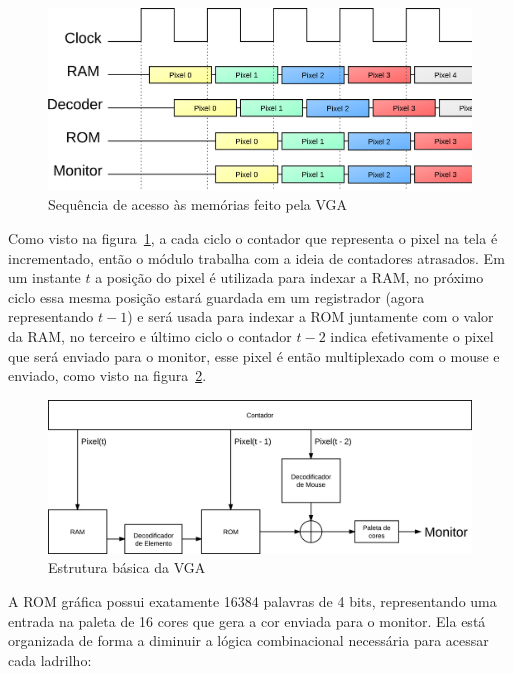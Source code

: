 \documentclass[12pt]{article}
\begin{document}
\begin{figure}[ht!]
	\centering
	\vspace{5mm}
	\includegraphics[scale=1]{img/sequence.png}
	\vspace{3mm}
	\caption{Sequência de acesso às memórias feito pela VGA}
	\label{fig:sequence}
\end{figure}

Como visto na figura~\ref{fig:sequence}, a cada ciclo o contador que representa
o pixel na tela é incrementado, então o módulo trabalha com a ideia de 
contadores atrasados. Em um instante $t$ a posição do pixel é utilizada para 
indexar a RAM, no próximo ciclo essa mesma posição estará guardada em um 
registrador (agora representando $t - 1$) e será usada para indexar a ROM 
juntamente com o valor da RAM, no terceiro e último ciclo o contador $t - 2$ indica
efetivamente o pixel que será enviado para o monitor, esse pixel é então 
multiplexado com o mouse e enviado, como visto na figura~\ref{fig:vgacom}.

\begin{figure}[ht!]
	\centering
	\vspace{5mm}
	\includegraphics[scale=0.85]{img/components.png}
	\vspace{3mm}
	\caption{Estrutura básica da VGA}
	\label{fig:vgacom}
\end{figure}

A ROM gráfica possui exatamente 16384 palavras de 4 bits, representando uma
entrada na paleta de 16 cores que gera a cor enviada para o monitor. Ela está
organizada de forma a diminuir a lógica combinacional necessária para acessar
cada ladrilho:
\end{document}
